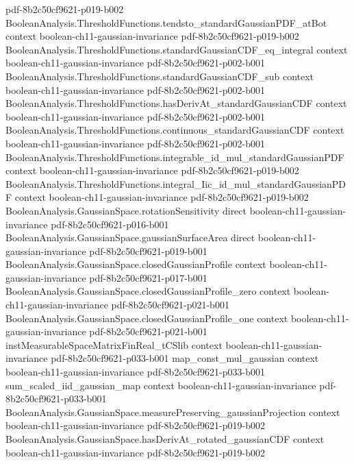 \begin{theorem}
  {pdf-8b2c50cf9621-p019-b002}
\proofstep
  {BooleanAnalysis.ThresholdFunctions.tendsto_standardGaussianPDF_atBot}
  {context}
  {boolean-ch11-gaussian-invariance}
  {pdf-8b2c50cf9621-p019-b002}
\proofstep
  {BooleanAnalysis.ThresholdFunctions.standardGaussianCDF_eq_integral}
  {context}
  {boolean-ch11-gaussian-invariance}
  {pdf-8b2c50cf9621-p002-b001}
\proofstep
  {BooleanAnalysis.ThresholdFunctions.standardGaussianCDF_sub}
  {context}
  {boolean-ch11-gaussian-invariance}
  {pdf-8b2c50cf9621-p002-b001}
\proofstep
  {BooleanAnalysis.ThresholdFunctions.hasDerivAt_standardGaussianCDF}
  {context}
  {boolean-ch11-gaussian-invariance}
  {pdf-8b2c50cf9621-p002-b001}
\proofstep
  {BooleanAnalysis.ThresholdFunctions.continuous_standardGaussianCDF}
  {context}
  {boolean-ch11-gaussian-invariance}
  {pdf-8b2c50cf9621-p002-b001}
\proofstep
  {BooleanAnalysis.ThresholdFunctions.integrable_id_mul_standardGaussianPDF}
  {context}
  {boolean-ch11-gaussian-invariance}
  {pdf-8b2c50cf9621-p019-b002}
\proofstep
  {BooleanAnalysis.ThresholdFunctions.integral_Iic_id_mul_standardGaussianPDF}
  {context}
  {boolean-ch11-gaussian-invariance}
  {pdf-8b2c50cf9621-p019-b002}
\proofstep
  {BooleanAnalysis.GaussianSpace.rotationSensitivity}
  {direct}
  {boolean-ch11-gaussian-invariance}
  {pdf-8b2c50cf9621-p016-b001}
\proofstep
  {BooleanAnalysis.GaussianSpace.gaussianSurfaceArea}
  {direct}
  {boolean-ch11-gaussian-invariance}
  {pdf-8b2c50cf9621-p019-b001}
\proofstep
  {BooleanAnalysis.GaussianSpace.closedGaussianProfile}
  {context}
  {boolean-ch11-gaussian-invariance}
  {pdf-8b2c50cf9621-p017-b001}
\proofstep
  {BooleanAnalysis.GaussianSpace.closedGaussianProfile_zero}
  {context}
  {boolean-ch11-gaussian-invariance}
  {pdf-8b2c50cf9621-p021-b001}
\proofstep
  {BooleanAnalysis.GaussianSpace.closedGaussianProfile_one}
  {context}
  {boolean-ch11-gaussian-invariance}
  {pdf-8b2c50cf9621-p021-b001}
\proofstep
  {instMeasurableSpaceMatrixFinReal_tCSlib}
  {context}
  {boolean-ch11-gaussian-invariance}
  {pdf-8b2c50cf9621-p033-b001}
\proofstep
  {map_const_mul_gaussian}
  {context}
  {boolean-ch11-gaussian-invariance}
  {pdf-8b2c50cf9621-p033-b001}
\proofstep
  {sum_scaled_iid_gaussian_map}
  {context}
  {boolean-ch11-gaussian-invariance}
  {pdf-8b2c50cf9621-p033-b001}
\proofstep
  {BooleanAnalysis.GaussianSpace.measurePreserving_gaussianProjection}
  {context}
  {boolean-ch11-gaussian-invariance}
  {pdf-8b2c50cf9621-p019-b002}
\proofstep
  {BooleanAnalysis.GaussianSpace.hasDerivAt_rotated_gaussianCDF}
  {context}
  {boolean-ch11-gaussian-invariance}
  {pdf-8b2c50cf9621-p019-b002}

\end{theorem}
